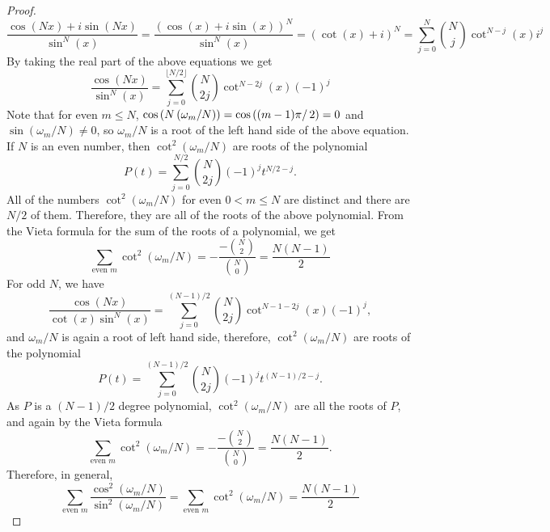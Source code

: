 \documentclass[12pt]{article}
\theoremstyle{definition}
\begin{document}
\begin{proof}
\[
\frac{\cos\left(Nx\right) + i\sin\left(Nx\right)}{\sin^{N}\left(x\right)} = \frac{\left(\cos\left(x\right) + i\sin\left(x\right)\right)^{N}}{\sin^{N}\left(x\right)} =\left( \cot(x) + i\right)^{N}=\sum_{j = 0}^{N}\binom{N}{j}\cot^{N-j}\left(x\right) i^{j}
\]
By taking the real part of the above equations we get
\[
\frac{\cos\left(Nx\right)}{\sin^{N}\left(x\right)} = \sum_{j = 0}^{\lfloor N/2\rfloor}\binom{N}{2j}\cot^{N-2j}\left(x\right) (-1)^{j}
\]
Note that for even $m\leq N$, $\cos\left(N\left(\omega_m/N\right)\right) = \cos\left((m-1)\pi\right/2) = 0$ and $\sin\left(\omega_m/N\right)\neq 0$, so $\omega_m/N$ is a root of the left hand side of the above equation. If $N$ is an even number, then $\cot^2\left(\omega_m/N\right)$ are roots of the polynomial
\[
P(t) = \sum_{j = 0}^{N/2}\binom{N}{2j}(-1)^{j} t ^{N/2 - j}.
\]
All of the numbers $\cot^2\left(\omega_m/N\right)$ for even $0<m\leq N$ are distinct and there are $N/2$ of them. Therefore, they are all of the roots of the above polynomial. From the Vieta formula for the sum of the roots of a polynomial, we get
\[
\sum_{\text{even } m}\cot^2\left(\omega_m/N\right) =  -\frac{-\binom{N}{2}}{\binom{N}{0}}  = \frac{N(N-1)}{2}
\]
For odd $N$, we have 
\[
\frac{\cos\left(Nx\right)}{\cot\left(x\right)\sin^{N}\left(x\right)} = \sum_{j = 0}^{ (N-1)/2}\binom{N}{2j}\cot^{N-1-2j}\left(x\right) (-1)^{j},
\]
and $\omega_m/N$ is again a root of left hand side, therefore, $\cot^2\left(\omega_m/N\right)$ are roots of the polynomial
\[
P(t) = \sum_{j = 0}^{(N-1)/2}\binom{N}{2j}(-1)^{j} t ^{(N-1)/2 - j}.
\]
As $P$ is a $(N-1)/2$ degree polynomial, $\cot^2\left(\omega_m/N\right)$ are all the roots of $P$, and again by the Vieta formula
\[
\sum_{\text{even } m}\cot^2\left(\omega_m/N\right)=  -\frac{-\binom{N}{2}}{\binom{N}{0}}  = \frac{N(N-1)}{2}.
\]
Therefore, in general,
\[
\sum_{\text{even }m} \frac{\cos^2\left(\omega_m/N\right)}{\sin^2\left(\omega_m/N\right)} = \sum_{\text{even } m} \cot^2\left(\omega_m/N\right) = \frac{N(N-1)}{2}
\]


\end{proof}
\end{document}

